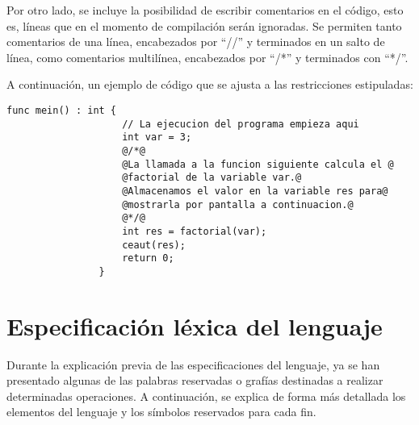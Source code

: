 \documentclass[10pt,a4paper]{article}
\begin{document}
Por otro lado, se incluye la posibilidad de escribir comentarios en el código, esto es, líneas que en el momento de compilación serán ignoradas. Se permiten tanto comentarios de una línea, encabezados por ``//'' y terminados en un salto de línea, como comentarios multilínea, encabezados por ``/*'' y terminados con ``*/''.

A continuación, un ejemplo de código que se ajusta a las restricciones estipuladas:

\begin{center}
    \begin{minipage}{\linewidth}
        \begin{lstlisting}[linewidth=0.7\linewidth, gobble=16]
                func mein() : int {
                    // La ejecucion del programa empieza aqui
                    int var = 3;
                    @/*@
                    @La llamada a la funcion siguiente calcula el @
                    @factorial de la variable var.@
                    @Almacenamos el valor en la variable res para@
                    @mostrarla por pantalla a continuacion.@
                    @*/@
                    int res = factorial(var);
                    ceaut(res);
                    return 0;
                }
        \end{lstlisting}
    \end{minipage}
\end{center}

\section{Especificación léxica del lenguaje}\label{sec:Especificación léxica del lenguaje}
Durante la explicación previa de las especificaciones del lenguaje, ya se han presentado algunas de las palabras reservadas o grafías destinadas a realizar determinadas operaciones. A continuación, se explica de forma más detallada los elementos del lenguaje y los símbolos reservados para cada fin.
\end{document}
